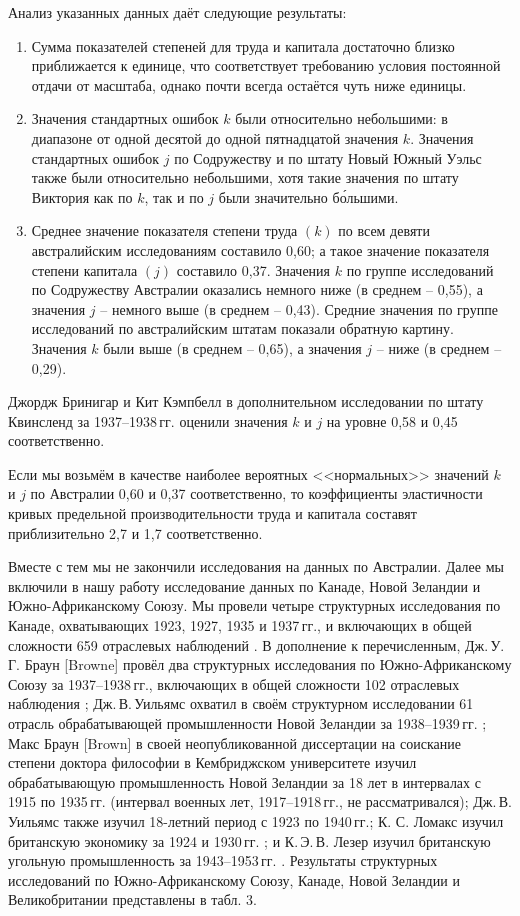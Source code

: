 \documentclass{article}
\begin{document}
Анализ указанных данных даёт следующие результаты:
\begin{enumerate}[{1.}]
\item Сумма показателей степеней для труда и капитала достаточно близко приближается к единице, что соответствует требованию условия постоянной отдачи от масштаба, однако почти всегда остаётся чуть ниже единицы.
\item Значения стандартных ошибок \(k\) были относительно небольшими: в диапазоне от одной десятой до одной пятнадцатой значения \(k\). Значения стандартных ошибок \(j\) по Содружеству и по штату Новый Южный Уэльс также были относительно небольшими, хотя такие значения по штату Виктория как по \(k\), так и по \(j\) были значительно б\'{о}льшими.
\item Среднее значение показателя степени труда \((k)\) по всем девяти австралийским исследованиям составило 0,60; а такое значение показателя степени капитала \((j)\) составило 0,37. Значения \(k\) по группе исследований по Содружеству Австралии оказались немного ниже (в среднем -- 0,55), а значения \(j\) -- немного выше (в среднем -- 0,43). Средние значения по группе исследований по австралийским штатам показали обратную картину. Значения \(k\) были выше (в среднем -- 0,65), а значения \(j\) -- ниже (в среднем -- 0,29).
\end{enumerate}

Джордж Бринигар и Кит Кэмпбелл в дополнительном исследовании по штату Квинсленд за 1937--1938\,гг. оценили значения \(k\) и \(j\) на уровне 0,58 и 0,45 соответственно.

Если мы возьмём в качестве наиболее вероятных <<нормальных>> значений \(k\) и \(j\) по Австралии 0,60 %
и 0,37 соответственно, то коэффициенты эластичности кривых предельной производительности труда и капитала составят приблизительно 2,7 и 1,7 соответственно.

Вместе с тем мы не закончили исследования на данных по Австралии. Далее мы включили в нашу работу исследование данных по Канаде, Новой Зеландии и Южно-Африканскому Союзу. Мы провели четыре структурных исследования по Канаде, охватывающих 1923, 1927, 1935 и 1937\,гг., и включающих в общей сложности 659 отраслевых наблюдений \cite{Douglas:2}. В дополнение к перечисленным, Дж.\,У.\,Г. Браун [Browne] провёл два структурных исследования по Южно-Африканскому Союзу за 1937--1938\,гг., включающих в общей сложности 102 отраслевых наблюдения \cite{Browne:1}; Дж.\,В.\,Уильямс охватил в своём структурном исследовании 61 отрасль обрабатывающей промышленности Новой Зеландии за 1938--1939\,гг. \cite{Douglas:7}; Макс Браун [Brown] в своей неопубликованной диссертации на соискание степени доктора философии в Кембриджском университете изучил обрабатывающую промышленность Новой Зеландии за 18 лет в интервалах с 1915 по 1935\,гг. (интервал военных лет, 1917--1918\,гг., не рассматривался); Дж.\,В. Уильямс также изучил 18-летний период с 1923 по 1940\,гг.; К. С. Ломакс изучил британскую экономику за 1924 и 1930\,гг. \cite{Lomax:1}; и К.\,Э.\,В. Лезер изучил британскую угольную промышленность за 1943--1953\,гг. \cite{Leser:1}. Результаты структурных исследований по Южно-Африканскому Союзу, Канаде, Новой Зеландии и Великобритании представлены в табл. 3.
\end{document}
